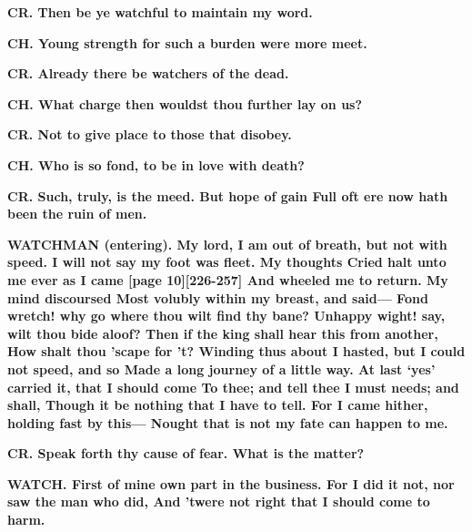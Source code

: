 \documentclass[11pt,letter]{book}
\begin{document}
\par \textbf{CR. Then be ye watchful to maintain my word.}
\par 

\par \textbf{CH. Young strength for such a burden were more meet.}
\par 

\par \textbf{CR. Already there be watchers of the dead.}
\par 

\par \textbf{CH. What charge then wouldst thou further lay on us?}
\par 

\par \textbf{CR. Not to give place to those that disobey.}
\par 

\par \textbf{CH. Who is so fond, to be in love with death?}
\par 

\par \textbf{CR. Such, truly, is the meed. But hope of gain Full oft ere now hath been the ruin of men.}
\par 

\par \textbf{WATCHMAN (entering). My lord, I am out of breath, but not with speed. I will not say my foot was fleet. My thoughts Cried halt unto me ever as I came [page 10][226-257] And wheeled me to return. My mind discoursed Most volubly within my breast, and said— Fond wretch! why go where thou wilt find thy bane? Unhappy wight! say, wilt thou bide aloof? Then if the king shall hear this from another, How shalt thou ’scape for ’t? Winding thus about I hasted, but I could not speed, and so Made a long journey of a little way. At last ‘yes’ carried it, that I should come To thee; and tell thee I must needs; and shall, Though it be nothing that I have to tell. For I came hither, holding fast by this— Nought that is not my fate can happen to me.}
\par 

\par \textbf{CR. Speak forth thy cause of fear. What is the matter?}
\par 

\par \textbf{WATCH. First of mine own part in the business. For I did it not, nor saw the man who did, And ’twere not right that I should come to harm.}
\par 
\end{document}
